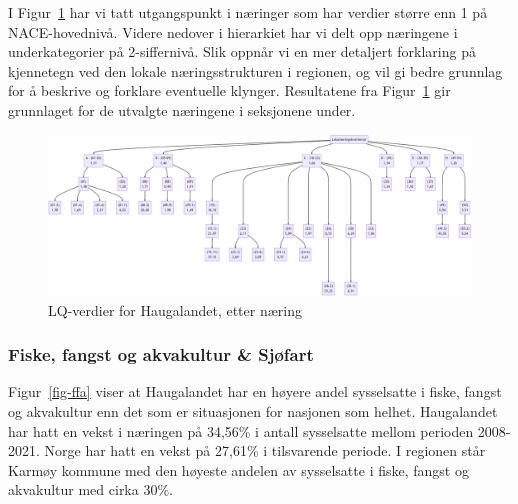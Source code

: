 \documentclass[
]{article}
\begin{document}
I Figur~\ref{fig-loq} har vi tatt utgangspunkt i næringer som har
verdier større enn 1 på NACE-hovednivå. Videre nedover i hierarkiet har
vi delt opp næringene i underkategorier på 2-siffernivå. Slik oppnår vi
en mer detaljert forklaring på kjennetegn ved den lokale
næringsstrukturen i regionen, og vil gi bedre grunnlag for å beskrive og
forklare eventuelle klynger. Resultatene fra Figur~\ref{fig-loq} gir
grunnlaget for de utvalgte næringene i seksjonene under.

\begin{figure}[H]

{\centering \includegraphics{bilder/LQ-hierarki.png}

}

\caption{\label{fig-loq}LQ-verdier for Haugalandet, etter næring}

\end{figure}

\hypertarget{fiske-fangst-og-akvakultur-sjuxf8fart}{%
\subsubsection{Fiske, fangst og akvakultur \&
Sjøfart}\label{fiske-fangst-og-akvakultur-sjuxf8fart}}

Figur~\ref{fig-ffa} viser at Haugalandet har en høyere andel sysselsatte
i fiske, fangst og akvakultur enn det som er situasjonen for nasjonen
som helhet. Haugalandet har hatt en vekst i næringen på 34,56\% i antall
sysselsatte mellom perioden 2008-2021. Norge har hatt en vekst på
27,61\% i tilsvarende periode. I regionen står Karmøy kommune med den
høyeste andelen av sysselsatte i fiske, fangst og akvakultur med cirka
30\%.
\end{document}
